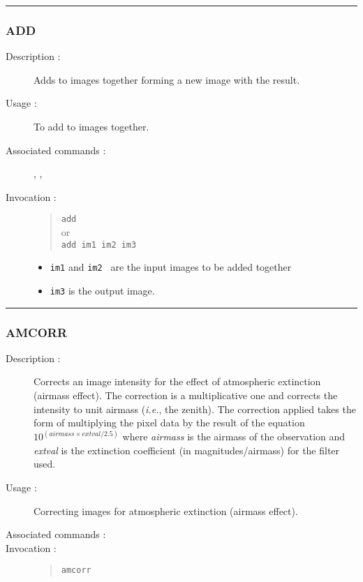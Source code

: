 \hrule
\subsubsection*{\label{ADD}ADD}

\begin{description}

\item[Description :] Adds to images together forming a new image with
the result.

\item[Usage :] To add to images together.

\item[Associated commands :] {\tt {}},
{\tt {}}, {\tt {}}

\item[Invocation :]

\begin{quote}
{\tt add} \\
or \\
{\tt  add im1 im2 im3}
\end{quote}

\begin{itemize}
\item {\tt im1} and {\tt im2 } are the input images to be added together
\item {\tt im3} is the output image.
\end{itemize}

\end{description}

\hrule
\subsubsection*{\label{AMCORR}AMCORR}

\begin{description}

\item[Description :] Corrects an image intensity for the effect of
atmospheric extinction (airmass effect).  The correction is a
multiplicative one and corrects the intensity to unit airmass
(\emph{i.e.}, the zenith).  The correction applied takes the form of
multiplying the pixel data by the result of the equation $10^{(airmass
\times extval/2.5)}$ where {\it airmass} is the airmass of the
observation and {\it extval} is the extinction coefficient (in
magnitudes/airmass) for the filter used.

\item[Usage :] Correcting images for atmospheric extinction (airmass effect).

\item[Associated commands :] {\tt {}}

\item[Invocation :]

\begin{quote}{\tt  amcorr }\end{quote}

\end{description}


